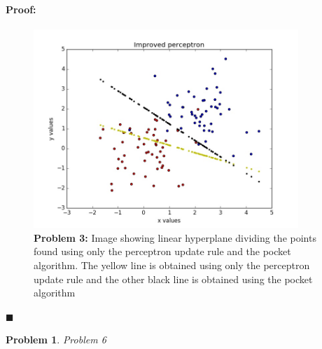 \documentclass[12pt]{article}
\newenvironment{proof}{\paragraph{Proof: }}{\hfill$\blacksquare$}
\newtheorem{problem}{Problem}%
\begin{document}
\begin{proof}
\begin{figure}[!htbp]
\centering
\includegraphics[width=10cm]{hw2_p5b_perceptron_update.jpg}
\caption{\textbf{Problem 3:} Image showing linear hyperplane dividing the points found using only the perceptron update rule and the pocket algorithm. The yellow line is obtained using only the perceptron update rule and the other black line is obtained using the pocket algorithm}
\end{figure}

\end{proof}

\begin{problem}
\normalfont
Problem 6
\end{problem}
\end{document}
